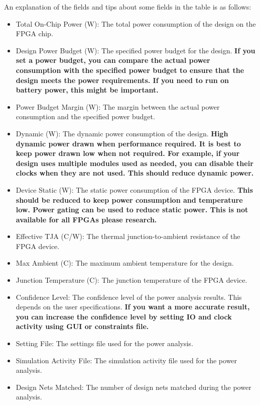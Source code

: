 \documentclass{report}
\begin{document}
An explanation of the fields and tips about some fields in the table is as follows:
\begin{itemize}
    \item Total On-Chip Power (W): The total power consumption of the design on the FPGA chip.
    \item Design Power Budget (W): The specified power budget for the design. \textbf{If you set a power budget, you can compare the actual power consumption with the specified power budget to ensure that the design meets the power requirements. If you need to run on battery power, this might be important.}
    \item Power Budget Margin (W): The margin between the actual power consumption and the specified power budget.
    \item Dynamic (W): The dynamic power consumption of the design. \textbf{High dynamic power drawn when performance required. It is best to keep power drawn low when not required. For example, if your design uses multiple modules used as needed, you can disable their clocks when they are not used. This should reduce dynamic power.}
    \item Device Static (W): The static power consumption of the FPGA device. \textbf{This should be reduced to keep power consumption and temperature low. Power gating can be used to reduce static power. This is not available for all FPGAs please research.}
    \item Effective TJA (C/W): The thermal junction-to-ambient resistance of the FPGA device.
    \item Max Ambient (C): The maximum ambient temperature for the design.
    \item Junction Temperature (C): The junction temperature of the FPGA device.
    \item Confidence Level: The confidence level of the power analysis results. This depends on the user specifications. \textbf{If you want a more accurate result, you can increase the confidence level by setting IO and clock activity using GUI or constraints file.}
    \item Setting File: The settings file used for the power analysis.
    \item Simulation Activity File: The simulation activity file used for the power analysis.
    \item Design Nets Matched: The number of design nets matched during the power analysis.
\end{itemize}
\end{document}
